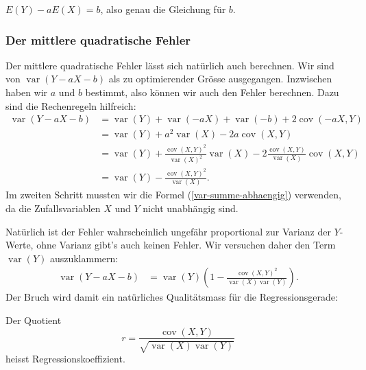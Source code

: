 $E(Y)-aE(X)=b$, also genau die Gleichung für $b$.

\subsubsection{Der mittlere quadratische Fehler}
Der mittlere quadratische Fehler lässt sich natürlich auch berechnen.
Wir sind von $\operatorname{var}(Y-aX-b)$ als zu optimierender
Grösse ausgegangen.
Inzwischen haben wir $a$ und $b$ bestimmt,
also können wir auch den Fehler berechnen.
Dazu sind die Rechenregeln
hilfreich:
\begin{align*}
\operatorname{var}(Y-aX-b)
&=
\operatorname{var}(Y) + 
\operatorname{var}(-aX) + 
\operatorname{var}(-b)
+2\operatorname{cov}(-aX,Y)
\\
&=
\operatorname{var}(Y)+a^2\operatorname{var}(X)-2a\operatorname{cov}(X,Y)
\\
&=
\operatorname{var}(Y)
+ \frac{\operatorname{cov}(X,Y)^2}{\operatorname{var}(X)^2}\operatorname{var}(X)
-2 \frac{\operatorname{cov}(X,Y)}{\operatorname{var}(X)}\operatorname{cov}(X,Y)
\\
&=
\operatorname{var}(Y)-\frac{\operatorname{cov}(X,Y)^2}{\operatorname{var}(X)}.
\end{align*}
Im zweiten Schritt mussten wir die Formel (\ref{var-summe-abhaengig})
verwenden, da die Zufallsvariablen $X$ und $Y$ nicht unabhängig sind.

Natürlich
ist der Fehler 
wahrscheinlich ungefähr proportional zur Varianz der $Y$-Werte,
ohne Varianz gibt's auch keinen Fehler.
Wir versuchen daher den Term
$\operatorname{var}(Y)$ auszuklammern:
\begin{align*}
\operatorname{var}(Y-aX-b)
&=
\operatorname{var}(Y)\left(1-\frac{\operatorname{cov}(X,Y)^2}{\operatorname{var}(X)\operatorname{var}(Y)}\right).
\end{align*}
Der Bruch wird damit ein natürliches Qualitätsmass für die Regressionsgerade:
\begin{definition}
Der Quotient
\[
r=\frac{\operatorname{cov}(X,Y)}{\sqrt{\operatorname{var}(X)\operatorname{var}(Y)}}
\]
heisst Regressionskoeffizient.
\end{definition}

